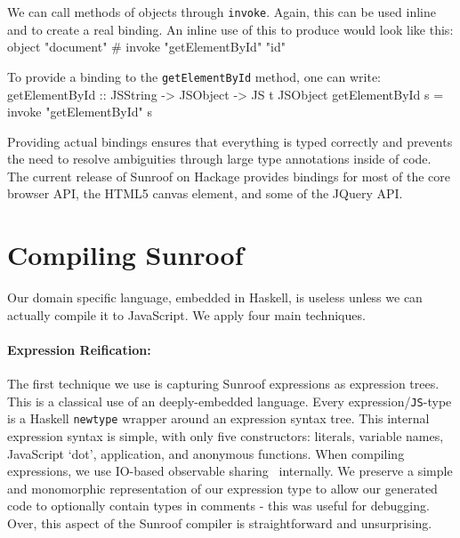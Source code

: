 \documentclass{llncs}
\newcommand{\Src}[1]{{\tt{#1}}}
\newenvironment{Code}{\verbatim}{\endverbatim}
\begin{document}
We can call methods of objects through \Src{invoke}. Again, this 
can be used inline and to create a real binding. An inline 
use of this to produce \linebreak\Src{document.getElementById("id")} would look like this: 
\begin{Code}
  object "document" # invoke "getElementById" "id"
\end{Code}

\newpage\noindent
To provide a binding 
to the \Src{getElementById} method, one can write:
\begin{Code}
getElementById :: JSString -> JSObject -> JS t JSObject
getElementById s = invoke "getElementById" s
\end{Code}

Providing actual bindings ensures that
everything is typed correctly and prevents the need to resolve ambiguities 
through large type annotations inside of code.
%
The current release of Sunroof on Hackage provides bindings for most of the 
core browser API, the HTML5 canvas element, and some of the JQuery API.


\section{Compiling Sunroof}
\label{sec:compiler}

Our domain specific language, embedded in Haskell, is useless unless
we can actually compile it to JavaScript. We apply four main techniques.

\paragraph{Expression Reification:}
The first technique we use is capturing Sunroof expressions as expression trees. 
This is a classical use of an deeply-embedded language. Every expression/\Src{JS}-type
is a Haskell \Src{newtype} wrapper around an expression syntax tree.
This internal expression syntax is simple, with only five constructors:
literals, variable names, JavaScript `dot', application, and anonymous functions.
When compiling expressions, we use IO-based observable sharing~\cite{...} internally.
We preserve a simple and monomorphic representation of our expression
type to allow our generated code to optionally contain types in comments -
this was useful for debugging.
Over, this aspect of the Sunroof compiler is straightforward and unsurprising.
\end{document}
